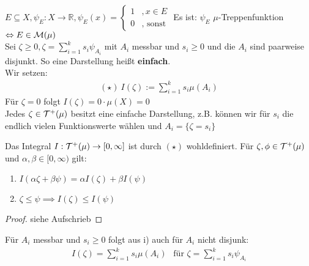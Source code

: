 \documentclass[11pt,a4paper,fleqn,openany]{report}
\begin{document}
    \begin{example}
      $E \subseteq X, \psi_E: X \to \mathbb{R}, \psi_E(x) = \begin{cases}
        1 & ,x \in E\\
        0 & ,\text{ sonst}
      \end{cases}$  Es ist: $\psi_E$ $\mu$-Treppenfunktion $\Leftrightarrow E \in \mathcal{M}(\mu)$\\
      Sei $\zeta \geq 0, \zeta = \sum\limits_{i=1}^k s_i \psi_{A_i}$ mit $A_i$ messbar und $s_i \geq 0$ und die $A_i$ sind paarweise disjunkt. So eine Darstellung heißt \textbf{einfach}.\\
      Wir setzen:
      \begin{align*}
        (\star) \ I(\zeta) := \sum\limits_{i=1}^k s_i \mu(A_i)
      \end{align*} 
      Für $\zeta=0$ folgt $I(\zeta) = 0 \cdot \mu(X) = 0$\\
      Jedes $\zeta \in \mathcal{T}^+(\mu)$ besitzt eine einfache Darstellung, z.B. können wir für $s_i$ die endlich vielen Funktionswerte wählen und $A_i = \{\zeta = s_i\}$
    \end{example}

    \begin{lemma}
      Das Integral $I: \mathcal{T}^+(\mu) \to [0,\infty]$ ist durch $(\star)$ wohldefiniert. Für $\zeta, \phi \in \mathcal{T}^+(\mu)$ und $\alpha, \beta \in [0, \infty)$ gilt:
      \begin{enumerate}[label=\roman*)]
        \item $I(\alpha \zeta + \beta \psi) = \alpha I(\zeta) + \beta I(\psi)$
        \item $\zeta \leq \psi \implies I(\zeta) \leq I(\psi)$ 
      \end{enumerate}
    \end{lemma}

    \begin{proof}
      siehe Aufschrieb
    \end{proof}

    \begin{remark}
      Für $A_i$ messbar und $s_i \geq 0$ folgt aus i) auch für $A_i$ nicht disjunk:
      \begin{align*}
        I(\zeta) = \sum\limits_{i=1}^k s_i \mu(A_i) \ \ \text{ für } \zeta = \sum\limits_{i=1}^k s_i \psi_{A_i}
      \end{align*}
    \end{remark}
\end{document}
